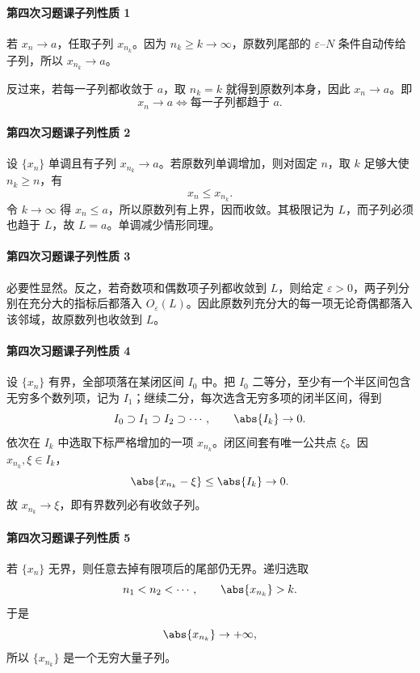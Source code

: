 \paragraph{第四次习题课子列性质 1}
\begin{xsolution}
若 $x_n\to a$，任取子列 $x_{n_k}$。因为 $n_k\ge k\to\infty$，原数列尾部的 $\varepsilon$--$N$ 条件自动传给子列，所以 $x_{n_k}\to a$。

反过来，若每一子列都收敛于 $a$，取 $n_k=k$ 就得到原数列本身，因此 $x_n\to a$。即
\[
  \boxed{x_n\to a\Longleftrightarrow\text{每一子列都趋于 }a}.
\]
\end{xsolution}

\paragraph{第四次习题课子列性质 2}
\begin{xsolution}
设 $\{x_n\}$ 单调且有子列 $x_{n_k}\to a$。若原数列单调增加，则对固定 $n$，取 $k$ 足够大使 $n_k\ge n$，有
\[
  x_n\le x_{n_k}.
\]
令 $k\to\infty$ 得 $x_n\le a$，所以原数列有上界，因而收敛。其极限记为 $L$，而子列必须也趋于 $L$，故 $L=a$。单调减少情形同理。
\end{xsolution}

\paragraph{第四次习题课子列性质 3}
\begin{xsolution}
必要性显然。反之，若奇数项和偶数项子列都收敛到 $L$，则给定 $\varepsilon>0$，两子列分别在充分大的指标后都落入 $O_\varepsilon(L)$。因此原数列充分大的每一项无论奇偶都落入该邻域，故原数列也收敛到 $L$。
\end{xsolution}

\paragraph{第四次习题课子列性质 4}
\begin{xsolution}
设 $\{x_n\}$ 有界，全部项落在某闭区间 $I_0$ 中。把 $I_0$ 二等分，至少有一个半区间包含无穷多个数列项，记为 $I_1$；继续二分，每次选含无穷多项的闭半区间，得到
\[
  I_0\supset I_1\supset I_2\supset\cdots,
  \qquad \abs{I_k}\to0.
\]
依次在 $I_k$ 中选取下标严格增加的一项 $x_{n_k}$。闭区间套有唯一公共点 $\xi$。因 $x_{n_k},\xi\in I_k$，
\[
  \abs{x_{n_k}-\xi}\le\abs{I_k}\to0.
\]
故 $x_{n_k}\to\xi$，即有界数列必有收敛子列。
\end{xsolution}

\paragraph{第四次习题课子列性质 5}
\begin{xsolution}
若 $\{x_n\}$ 无界，则任意去掉有限项后的尾部仍无界。递归选取
\[
  n_1<n_2<\cdots,
  \qquad
  \abs{x_{n_k}}>k.
\]
于是
\[
  \abs{x_{n_k}}\to+\infty,
\]
所以 $\{x_{n_k}\}$ 是一个无穷大量子列。
\end{xsolution}

